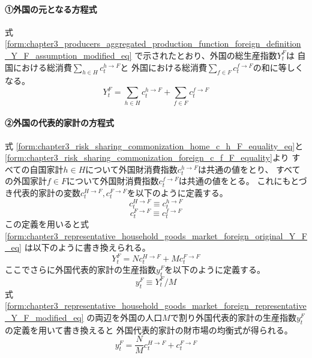 \paragraph{①外国の元となる方程式}
\label{sec:chapter3_representative_household_goods_market_foreign_original}
式
\eqref{form:chapter3_producers_aggregated_production_function_foreign_definition_Y_F_assumption_modified_eq}
で示されたとおり、外国の総生産指数\(Y_t^F\)は
自国における総消費\(\sum_{h\in H}c_t^{h\to F}\)と
外国における総消費\(\sum_{f\in F}c_t^{f\to F}\)の和に等しくなる。
\begin{equation}
\label{form:chapter3_representative_household_goods_market_foreign_original_Y_F_eq}
    Y_t^F=\sum_{h\in H}c_t^{h\to F}+\sum_{f\in F}c_t^{f\to F}
\end{equation}

\paragraph{②外国の代表的家計の方程式}
\label{sec:chapter3_representative_household_goods_market_foreign_representative}
式
\eqref{form:chapter3_risk_sharing_commonization_home_c_h_F_equality_eq}と
\eqref{form:chapter3_risk_sharing_commonization_foreign_c_f_F_equality}より
すべての自国家計\(h\in H\)について外国財消費指数\(c_t^{h\to F}\)は共通の値をとり、
すべての外国家計\(f\in F\)について外国財消費指数\(c_t^{f\to F}\)は共通の値をとる。
これにもとづき代表的家計の変数\(c_t^{H\to F}, c_t^{F\to F}\)を以下のように定義する。
\begin{equation}
\label{form:chapter3_representative_household_goods_market_foreign_representative_c_H_F_def}
    c_t^{H\to F}\equiv c_t^{h\to F}
\end{equation}
\begin{equation}
\label{form:chapter3_representative_household_goods_market_foreign_representative_c_F_F_def}
    c_t^{F\to F}\equiv c_t^{f\to F}
\end{equation}
この定義を用いると式
\eqref{form:chapter3_representative_household_goods_market_foreign_original_Y_F_eq}
は以下のように書き換えられる。
\begin{equation}
\label{form:chapter3_representative_household_goods_market_foreign_representative_Y_F_modified_eq}
    Y_t^F=Nc_t^{H\to F}+Mc_t^{F\to F}
\end{equation}
ここでさらに外国代表的家計の生産指数\(y_t^F\)を以下のように定義する。
\begin{equation}
\label{form:chapter3_representative_household_goods_market_foreign_representative_y_F_def}
    y_t^F\equiv Y_t^F/M
\end{equation}
式
\eqref{form:chapter3_representative_household_goods_market_foreign_representative_Y_F_modified_eq}
の両辺を外国の人口\(M\)で割り外国代表的家計の生産指数\(y_t^F\)の定義を用いて書き換えると
外国代表的家計の財市場の均衡式が得られる。
\begin{equation}
\label{form:chapter3_representative_household_goods_market_foreign_representative_y_F_eq}
    y_t^F=\frac{N}{M}c_t^{H\to F}+c_t^{F\to F}
\end{equation}